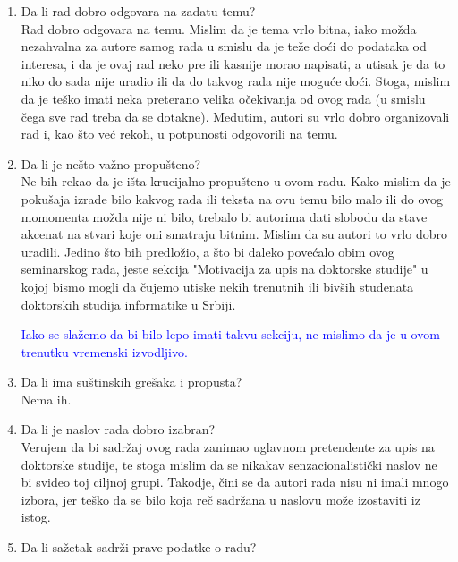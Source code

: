 \documentclass[a4paper]{report}
\newcommand{\odgovor}[1]{\textcolor{blue}{#1}}
\begin{document}
\begin{enumerate}
\item Da li rad dobro odgovara na zadatu temu?\\

Rad dobro odgovara na temu. Mislim da je tema vrlo bitna, iako možda nezahvalna za autore samog rada u smislu da je 
teže doći do podataka od interesa, i da je ovaj rad neko pre ili kasnije morao napisati, a utisak je 
da to niko do sada nije uradio ili da do takvog rada nije moguće doći. Stoga, mislim da je teško imati neka preterano velika očekivanja od ovog rada (u smislu čega sve rad treba da se dotakne). Međutim, autori su vrlo dobro organizovali rad i, kao što već rekoh, u potpunosti odgovorili na temu.

\item Da li je nešto važno propušteno?\\

Ne bih rekao da je išta krucijalno propušteno u ovom radu. Kako mislim da je pokušaja izrade bilo kakvog 
rada ili teksta na ovu temu bilo malo ili do ovog momomenta možda nije ni bilo, trebalo bi autorima dati 
slobodu da stave akcenat na stvari koje oni smatraju bitnim. Mislim da su autori to vrlo dobro uradili. 
Jedino što bih predložio, a što bi daleko povećalo obim ovog seminarskog rada, jeste sekcija "Motivacija 
za upis na doktorske studije" u kojoj bismo mogli da čujemo utiske nekih trenutnih ili bivših studenata 
doktorskih studija informatike u Srbiji. 

\odgovor{Iako se slažemo da bi bilo lepo imati takvu sekciju, ne mislimo da je u ovom trenutku vremenski izvodljivo.}

\item Da li ima suštinskih grešaka i propusta?\\

Nema ih.

\item Da li je naslov rada dobro izabran?\\

Verujem da bi sadržaj ovog rada zanimao uglavnom pretendente za upis na doktorske studije, te stoga 
mislim da se nikakav senzacionalistički naslov ne bi svideo toj ciljnoj grupi. Takodje, čini se da 
autori rada nisu ni imali mnogo izbora, jer teško da se bilo koja reč sadržana u naslovu može izostaviti 
iz istog.

\item Da li sažetak sadrži prave podatke o radu?\\ 


\end{enumerate}
\end{document}
